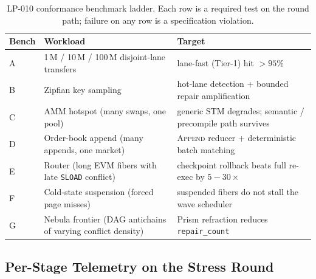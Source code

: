 \begin{table}[ht]
\centering
\small
\begin{tabular}{@{}llp{6.6cm}@{}}
\toprule
\textbf{Bench} & \textbf{Workload} & \textbf{Target} \\
\midrule
A & 1\,M / 10\,M / 100\,M disjoint-lane transfers
   & lane-fast (Tier-1) hit $> 95\%$ \\
B & Zipfian key sampling
   & hot-lane detection + bounded repair amplification \\
C & AMM hotspot (many swaps, one pool)
   & generic STM degrades; semantic / precompile path survives \\
D & Order-book append (many appends, one market)
   & \textsc{Append} reducer + deterministic batch matching \\
E & Router (long EVM fibers with late \texttt{SLOAD} conflict)
   & checkpoint rollback beats full re-exec by $5{-}30\times$ \\
F & Cold-state suspension (forced page misses)
   & suspended fibers do not stall the wave scheduler \\
G & Nebula frontier (DAG antichains of varying conflict density)
   & Prism refraction reduces \texttt{repair\_count} \\
\bottomrule
\end{tabular}
\caption{LP-010 conformance benchmark ladder. Each row is a
required test on the round path; failure on any row is a
specification violation.}
\label{tab:bench-ladder}
\end{table}

\subsection{Per-Stage Telemetry on the Stress Round}

